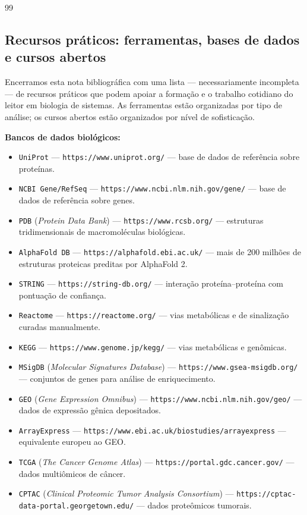 \begin{thebibliography}{99}
\subsection*{Recursos práticos: ferramentas, bases de dados e cursos abertos}

Encerramos esta nota bibliográfica com uma lista --- necessariamente incompleta --- de recursos práticos que podem apoiar a formação e o trabalho cotidiano do leitor em biologia de sistemas. As ferramentas estão organizadas por tipo de análise; os cursos abertos estão organizados por nível de sofisticação.

\textbf{Bancos de dados biológicos:}
\begin{itemize}
  \item \texttt{UniProt} --- \texttt{https://www.uniprot.org/} --- base de dados de referência sobre proteínas.
  \item \texttt{NCBI Gene/RefSeq} --- \texttt{https://www.ncbi.nlm.nih.gov/gene/} --- base de dados de referência sobre genes.
  \item \texttt{PDB} (\emph{Protein Data Bank}) --- \texttt{https://www.rcsb.org/} --- estruturas tridimensionais de macromoléculas biológicas.
  \item \texttt{AlphaFold DB} --- \texttt{https://alphafold.ebi.ac.uk/} --- mais de 200 milhões de estruturas proteicas preditas por AlphaFold 2.
  \item \texttt{STRING} --- \texttt{https://string-db.org/} --- interação proteína--proteína com pontuação de confiança.
  \item \texttt{Reactome} --- \texttt{https://reactome.org/} --- vias metabólicas e de sinalização curadas manualmente.
  \item \texttt{KEGG} --- \texttt{https://www.genome.jp/kegg/} --- vias metabólicas e genômicas.
  \item \texttt{MSigDB} (\emph{Molecular Signatures Database}) --- \texttt{https://www.gsea-msigdb.org/} --- conjuntos de genes para análise de enriquecimento.
  \item \texttt{GEO} (\emph{Gene Expression Omnibus}) --- \texttt{https://www.ncbi.nlm.nih.gov/geo/} --- dados de expressão gênica depositados.
  \item \texttt{ArrayExpress} --- \texttt{https://www.ebi.ac.uk/biostudies/arrayexpress} --- equivalente europeu ao GEO.
  \item \texttt{TCGA} (\emph{The Cancer Genome Atlas}) --- \texttt{https://portal.gdc.cancer.gov/} --- dados multiômicos de câncer.
  \item \texttt{CPTAC} (\emph{Clinical Proteomic Tumor Analysis Consortium}) --- \texttt{https://cptac-data-portal.georgetown.edu/} --- dados proteômicos tumorais.

\end{itemize}
\end{thebibliography}
